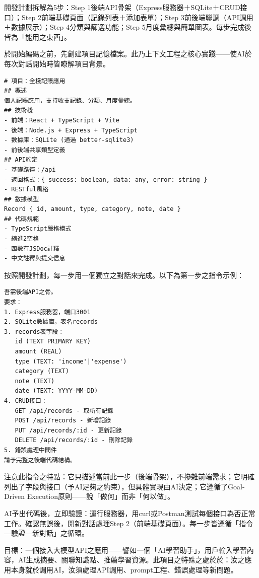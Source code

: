 開發計劃拆解為5步：Step 1後端API骨架（Express服務器＋SQLite＋CRUD接口）；Step 2前端基礎頁面（記錄列表＋添加表單）；Step 3前後端聯調（API調用＋數據展示）；Step 4分類與篩選功能；Step 5月度彙總與簡單圖表。每步完成後皆為「能用之東西」。


於開始編碼之前，先創建項目記憶檔案。此乃上下文工程之核心實踐——使AI於每次對話開始時皆瞭解項目背景。

\begin{lstlisting}
# 項目：全棧記賬應用
## 概述
個人記賬應用，支持收支記錄、分類、月度彙總。
## 技術棧
- 前端：React + TypeScript + Vite
- 後端：Node.js + Express + TypeScript
- 數據庫：SQLite (通過 better-sqlite3)
- 前後端共享類型定義
## API約定
- 基礎路徑：/api
- 返回格式：{ success: boolean, data: any, error: string }
- RESTful風格
## 數據模型
Record { id, amount, type, category, note, date }
## 代碼規範
- TypeScript嚴格模式
- 縮進2空格
- 函數有JSDoc註釋
- 中文註釋與提交信息
\end{lstlisting}


按照開發計劃，每一步用一個獨立之對話來完成。以下為第一步之指令示例：

\begin{lstlisting}
吾需後端API之骨。
要求：
1. Express服務器，端口3001
2. SQLite數據庫，表名records
3. records表字段：
   id (TEXT PRIMARY KEY)
   amount (REAL)
   type (TEXT: 'income'|'expense')
   category (TEXT)
   note (TEXT)
   date (TEXT: YYYY-MM-DD)
4. CRUD接口：
   GET /api/records - 取所有記錄
   POST /api/records - 新增記錄
   PUT /api/records/:id - 更新記錄
   DELETE /api/records/:id - 刪除記錄
5. 錯誤處理中間件
請予完整之後端代碼結構。
\end{lstlisting}

注意此指令之特點：它只描述當前此一步（後端骨架），不摻雜前端需求；它明確列出了字段與接口（予AI足夠之約束），但具體實現由AI決定；它遵循了Goal-Driven Execution原則——說「做何」而非「何以做」。

AI予出代碼後，立即驗證：運行服務器，用curl或Postman測試每個接口為否正常工作。確認無誤後，開新對話處理Step 2（前端基礎頁面）。每一步皆遵循「指令—驗證—新對話」之循環。



目標：一個接入大模型API之應用——譬如一個「AI學習助手」，用戶輸入學習內容，AI生成摘要、關聯知識點、推薦學習資源。此項目之特殊之處於於：汝之應用本身就於調用AI，汝須處理API調用、prompt工程、錯誤處理等新問題。

